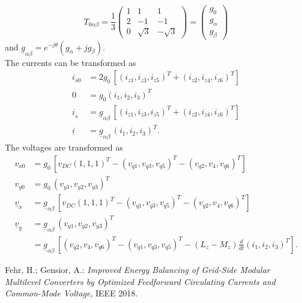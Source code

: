 \documentclass[10pt,a4paper]{article}
\begin{document}
	\begin{equation}
		T_{0\alpha\beta}= \frac{1}{3} 
		\left(\begin{array}{rrr}
			1 & 1 & 1\\
			2 & -1 & -1 \\
			0 & \sqrt{3} & -\sqrt{3}
		\end{array} \right) = 
		\left( \begin{array}{r}
			g_0 \\ g_\alpha \\ g_\beta
		\end{array}\right)
	\end{equation}
	and $\underline{g}_{\alpha\beta}=e^{-j\theta}(g_{\alpha}+jg_{\beta})$. \\
	The currents can be transformed as
	\begin{subequations}
	\begin{align}
		i_{s0} &= 2g_0 \, [(i_{z1},i_{z3},i_{z5})^T+(i_{z2},i_{z4},i_{z6})^T]	\\
		0 &= g_0 (i_1,i_2,i_3)^T 	\\
		\underline{i}_s &= \underline{g}_{\alpha\beta} \, [(i_{z1},i_{z3},i_{z5})^T+(i_{z2},i_{z4},i_{z6})^T]	\\
		\underline{i} &= \underline{g}_{\alpha\beta} \, (i_1,i_2,i_3)^T.
	\end{align}	
	\end{subequations}
	The voltages are transformed as
	\begin{subequations}	
	\begin{align}
		v_{x0} &= g_0 \, [v_{DC}(1,1,1)^T - (v_{q1},v_{q3},v_{q5})^T-(v_{q2},v_{4},v_{q6})^T]		\\
		v_{y0} &= g_0 \, (v_{y1},v_{y2},v_{y3})^T 	\\
		\underline{v}_x &= \underline{g}_{\alpha\beta} \, [v_{DC}(1,1,1)^T - (v_{q1},v_{q3},v_{q5})^T-(v_{q2},v_{4},v_{q6})^T]		\\
		\underline{v}_y &= \underline{g}_{\alpha\beta} \, (v_{y1},v_{y2},v_{y3})^T \\
		&= \underline{g}_{\alpha\beta} \, [(v_{q2},v_{4},v_{q6})^T - (v_{q1},v_{q3},v_{q5})^T - (L_z - M_z) \frac{d}{dt}(i_1,i_2,i_3)^T ].
	\end{align}
	\end{subequations}
	
	


	\begin{thebibliography}{10}		
		Fehr, H.; Gensior, A.: 
		\textit{Improved Energy Balancing of Grid-Side Modular
			Multilevel Converters by Optimized Feedforward
			Circulating Currents and Common-Mode Voltage}, IEEE 2018.
	\end{thebibliography}
\end{document}
